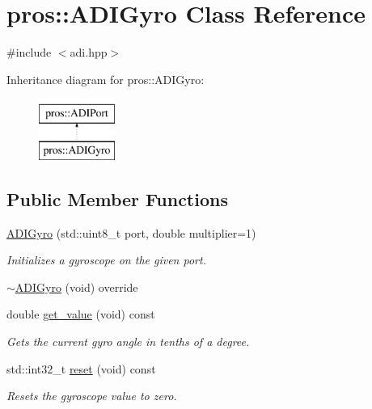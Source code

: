 \hypertarget{classpros_1_1ADIGyro}{}\section{pros\+::A\+D\+I\+Gyro Class Reference}
\label{classpros_1_1ADIGyro}


{\ttfamily \#include $<$adi.\+hpp$>$}

Inheritance diagram for pros\+::A\+D\+I\+Gyro\+:\begin{figure}[H]
\begin{center}
\leavevmode
\includegraphics[height=2.000000cm]{classpros_1_1ADIGyro}
\end{center}
\end{figure}
\subsection*{Public Member Functions}
\begin{DoxyCompactItemize}
\item 
\mbox{\hyperlink{classpros_1_1ADIGyro_adc826b3bcb88213a0df283178279662a}{A\+D\+I\+Gyro}} (std\+::uint8\+\_\+t port, double multiplier=1)
\begin{DoxyCompactList}\small\item\em Initializes a gyroscope on the given port. \end{DoxyCompactList}\item 
\mbox{\hyperlink{classpros_1_1ADIGyro_aa54d1f36850ba9a3ab6c749238950843}{$\sim$\+A\+D\+I\+Gyro}} (void) override
\item 
double \mbox{\hyperlink{classpros_1_1ADIGyro_a829f933aaaa370483c36aba9f4a4f09c}{get\+\_\+value}} (void) const
\begin{DoxyCompactList}\small\item\em Gets the current gyro angle in tenths of a degree. \end{DoxyCompactList}\item 
std\+::int32\+\_\+t \mbox{\hyperlink{classpros_1_1ADIGyro_a3e2df8c21f4eb0bfa3559834221195fe}{reset}} (void) const
\begin{DoxyCompactList}\small\item\em Resets the gyroscope value to zero. \end{DoxyCompactList}\end{DoxyCompactItemize}


